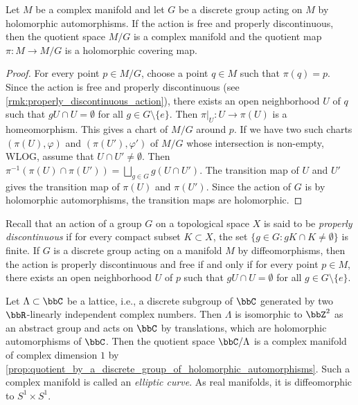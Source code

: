    \begin{proposition}\label{prop:quotient_by_a_discrete_group_of_holomorphic_automorphisms}
        Let \(M\) be a complex manifold and let \(G\) be a discrete group acting on \(M\) by holomorphic automorphisms.
        If the action is free and properly discontinuous, then the quotient space \(M/G\) is a complex manifold and the quotient map \(\pi: M\to M/G\) is a holomorphic covering map.
    \end{proposition}
    \begin{proof}
        For every point \(p\in M/G\), choose a point \(q\in M\) such that \(\pi(q) = p\).
        Since the action is free and properly discontinuous (see \cref{rmk:properly_discontinuous_action}), there exists an open neighborhood \(U\) of \(q\) such that \(gU \cap U = \emptyset\) for all \(g\in G\setminus \{e\}\).
        Then \(\pi|_U: U \to \pi(U)\) is a homeomorphism.
        This gives a chart of \(M/G\) around \(p\).
        If we have two such charts \((\pi(U),\varphi)\) and \((\pi(U'),\varphi')\) of \(M/G\) whose intersection is non-empty, WLOG, assume that \(U \cap U' \neq \emptyset\).
        Then \(\pi^{-1}(\pi(U) \cap \pi(U')) = \bigsqcup_{g\in G} g(U \cap U')\).
        The transition map of \(U\) and \(U'\) gives the transition map of \(\pi(U)\) and \(\pi(U')\).
        Since the action of \(G\) is by holomorphic automorphisms, the transition maps are holomorphic.
    \end{proof}
    \begin{remark}\label{rmk:properly_discontinuous_action}
        Recall that an action of a group \(G\) on a topological space \(X\) is said to be \emph{properly discontinuous} if for every compact subset \(K \subset X\), the set \(\{g\in G: gK \cap K \neq \emptyset\}\) is finite.
        If \(G\) is a discrete group acting on a manifold \(M\) by diffeomorphisms, 
        then the action is properly discontinuous and free if and only if for every point \(p\in M\), 
        there exists an open neighborhood \(U\) of \(p\) such that \(gU \cap U = \emptyset\) for all \(g\in G\setminus \{e\}\).
    \end{remark}

    \begin{example}\label{eg:elliptic_curves_as_complex_manifolds_by_quotient_of_C}
        Let \(\Lambda \subset \bbC\) be a lattice, i.e., a discrete subgroup of \(\bbC\) generated by two \(\bbR\)-linearly independent complex numbers.
        Then \(\Lambda\) is isomorphic to \(\bbZ^2\) as an abstract group and acts on \(\bbC\) by translations, which are holomorphic automorphisms of \(\bbC\).
        Then the quotient space \(\bbC/\Lambda\) is a complex manifold of complex dimension \(1\) by \cref{prop:quotient_by_a_discrete_group_of_holomorphic_automorphisms}.
        Such a complex manifold is called an \emph{elliptic curve}.
        As real manifolds, it is diffeomorphic to \(S^1 \times S^1\).
    \end{example}

